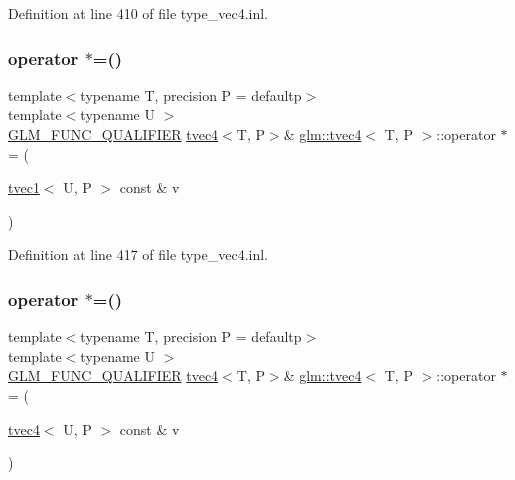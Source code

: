 Definition at line 410 of file type\+\_\+vec4.\+inl.

\mbox{\label{structglm_1_1tvec4_aafe35b1f77aa35b89fcc7bced2fce0a0}} 
\subsubsection{\texorpdfstring{operator $\ast$=()}{operator *=()}\hspace{0.1cm}{\footnotesize\ttfamily [5/6]}}
{\footnotesize\ttfamily template$<$typename T, precision P = defaultp$>$ \\
template$<$typename U $>$ \\
\mbox{\hyperlink{setup_8hpp_a33fdea6f91c5f834105f7415e2a64407}{G\+L\+M\+\_\+\+F\+U\+N\+C\+\_\+\+Q\+U\+A\+L\+I\+F\+I\+ER}} \mbox{\hyperlink{structglm_1_1tvec4}{tvec4}}$<$T, P$>$\& \mbox{\hyperlink{structglm_1_1tvec4}{glm\+::tvec4}}$<$ T, P $>$\+::operator $\ast$= (\begin{DoxyParamCaption}\item[{\mbox{\hyperlink{structglm_1_1tvec1}{tvec1}}$<$ U, P $>$ const \&}]{v }\end{DoxyParamCaption})}



Definition at line 417 of file type\+\_\+vec4.\+inl.

\mbox{\label{structglm_1_1tvec4_adb33f6b24ccf8703a1bb5a0885433adf}} 
\subsubsection{\texorpdfstring{operator $\ast$=()}{operator *=()}\hspace{0.1cm}{\footnotesize\ttfamily [6/6]}}
{\footnotesize\ttfamily template$<$typename T, precision P = defaultp$>$ \\
template$<$typename U $>$ \\
\mbox{\hyperlink{setup_8hpp_a33fdea6f91c5f834105f7415e2a64407}{G\+L\+M\+\_\+\+F\+U\+N\+C\+\_\+\+Q\+U\+A\+L\+I\+F\+I\+ER}} \mbox{\hyperlink{structglm_1_1tvec4}{tvec4}}$<$T, P$>$\& \mbox{\hyperlink{structglm_1_1tvec4}{glm\+::tvec4}}$<$ T, P $>$\+::operator $\ast$= (\begin{DoxyParamCaption}\item[{\mbox{\hyperlink{structglm_1_1tvec4}{tvec4}}$<$ U, P $>$ const \&}]{v }\end{DoxyParamCaption})}



